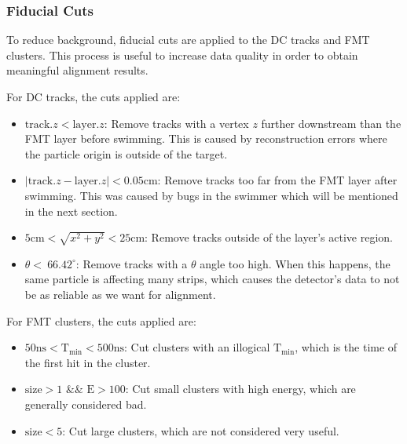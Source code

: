 \subsubsection{Fiducial Cuts}
\label{sssec::fiducial_cuts}
    To reduce background, fiducial cuts are applied to the DC tracks and FMT clusters.
    This process is useful to increase data quality in order to obtain meaningful alignment results.

    For DC tracks, the cuts applied are:
    \begin{itemize}
        \item $\text{track}.z < \text{layer}.z$:
        Remove tracks with a vertex $z$ further downstream than the FMT layer before swimming.
        This is caused by reconstruction errors where the particle origin is outside of the target.
        \item $\mid\text{track}.z - \text{layer}.z\mid < 0.05 \text{cm}$:
        Remove tracks too far from the FMT layer after swimming.
        This was caused by bugs in the swimmer which will be mentioned in the next section.
        \item $5 \text{cm} < \sqrt{x^2 + y^2} < 25 \text{cm}$:
        Remove tracks outside of the layer's active region.
        \item $\theta < ~66.42^{\circ}$:
        Remove tracks with a $\theta$ angle too high.
        When this happens, the same particle is affecting many strips, which causes the detector's data to not be as reliable as we want for alignment.
    \end{itemize}

    For FMT clusters, the cuts applied are:
    \begin{itemize}
        \item $50 \text{ns} < \text{T}_{\text{min}} < 500 \text{ns}$:
        Cut clusters with an illogical $\text{T}_{\text{min}}$, which is the time of the first hit in the cluster.
        \item $\text{size} > 1$ $\&\&$ $\text{E} > 100$:
        Cut small clusters with high energy, which are generally considered bad.
        \item $\text{size} < 5$:
        Cut large clusters, which are not considered very useful.
    \end{itemize}
